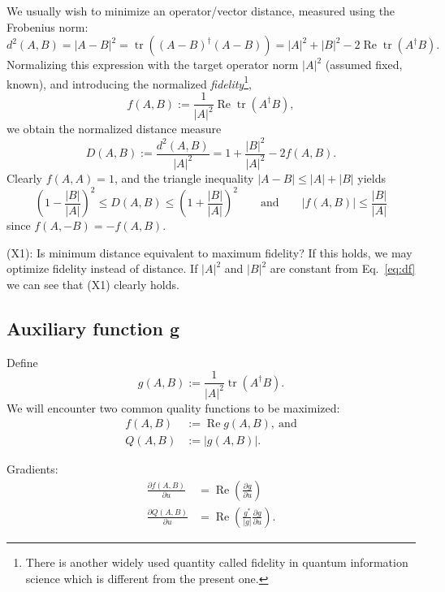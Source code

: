 \documentclass[aps, pra, a4paper, longbibliography]{revtex4}
\newcommand{\be}{\begin{equation}}
\newcommand{\ee}{\end{equation}}
\DeclareMathOperator{\tr}{tr}
\DeclareMathOperator{\re}{Re}
\newcommand{\dd}[2]{\frac{\partial #1}{\partial #2}}
\begin{document}
We usually wish to minimize an operator/vector distance, measured using the Frobenius norm:
\be
d^2(A, B) = |A-B|^2 = \tr((A-B)^\dagger (A-B))
= |A|^2 +|B|^2 -2 \re \tr(A^\dagger B).
\ee
Normalizing this expression with the target operator norm $|A|^2$ (assumed fixed, known),
and introducing the normalized \emph{fidelity}\footnote{
There is another widely used quantity called fidelity in quantum information science which is different from the present one.},
\be
f(A, B) := \frac{1}{|A|^2} \re \tr(A^\dagger B),
\ee
we obtain the normalized distance measure
\be
\label{eq:df}
D(A,B)
:= \frac{d^2(A, B)}{|A|^2}
= 1 +\frac{|B|^2}{|A|^2} -2 f(A, B).
\ee
Clearly $f(A, A) = 1$, and
the triangle inequality $|A-B| \le |A|+|B|$ yields
\be
\left(1 -\frac{|B|}{|A|} \right)^2 \le D(A, B) \le \left(1 +\frac{|B|}{|A|} \right)^2
\qquad \text{and} \qquad
|f(A, B)|
\le \frac{|B|}{|A|}
\ee
since $f(A, -B) = -f(A, B)$.


(X1): Is minimum distance equivalent to maximum fidelity?
If this holds, we may optimize fidelity instead of distance.
If $|A|^2$ and $|B|^2$ are constant
from Eq.~\eqref{eq:df} we can see that (X1) clearly holds.



\subsection{Auxiliary function g}

Define
\be
g(A, B) := \frac{1}{|A|^2} \tr(A^\dagger B).
\ee
We will encounter two common quality functions to be maximized:
\begin{align}
f(A,B) &:= \re g(A,B), \: \text{and}\\
Q(A,B) &:= |g(A,B)|.
\end{align}

Gradients:
\begin{align}
\dd{f(A,B)}{u}
&= \re \left( \dd{g}{u} \right) \\
\dd{Q(A,B)}{u}
&= \re \left(\frac{g^*}{|g|} \dd{g}{u} \right).
\end{align}
\end{document}
